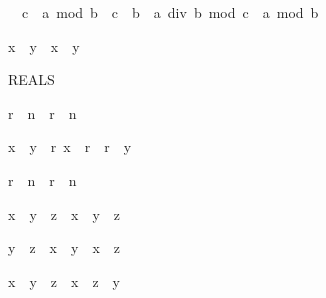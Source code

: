 \begin{isabellebody}
\begin{isamarkuptext}
\begin{isabelle}%
{\isacharhash}{}\ {\isacharless}\ c\ {\isasymLongrightarrow}\ a\ mod\ {\isacharparenleft}b\ {\isacharasterisk}\ c{\isacharparenright}\ {\isacharequal}\ b\ {\isacharasterisk}\ {\isacharparenleft}a\ div\ b\ mod\ c{\isacharparenright}\ {\isacharplus}\ a\ mod\ b%
\end{isabelle}

\begin{isabelle}%
{\isasymbar}x\ {\isacharasterisk}\ y{\isasymbar}\ {\isacharequal}\ {\isasymbar}x{\isasymbar}\ {\isacharasterisk}\ {\isasymbar}y{\isasymbar}%
\end{isabelle}
%
\end{isamarkuptext}%
%
\begin{isamarkuptext}%
REALS

\begin{isabelle}%
{\isasymbar}r{\isasymbar}\ {\isacharcircum}\ n\ {\isacharequal}\ {\isasymbar}r\ {\isacharcircum}\ n{\isasymbar}%
\end{isabelle}

\begin{isabelle}%
x\ {\isacharless}\ y\ {\isasymLongrightarrow}\ {\isasymexists}r{\isachardot}\ x\ {\isacharless}\ r\ {\isasymand}\ r\ {\isacharless}\ y%
\end{isabelle}

\begin{isabelle}%
{\isasymbar}r{\isasymbar}\ {\isacharcircum}\ n\ {\isacharequal}\ {\isasymbar}r\ {\isacharcircum}\ n{\isasymbar}%
\end{isabelle}

\begin{isabelle}%
x\ {\isacharasterisk}\ {\isacharparenleft}y\ {\isacharslash}\ z{\isacharparenright}\ {\isacharequal}\ x\ {\isacharasterisk}\ y\ {\isacharslash}\ z%
\end{isabelle}

\begin{isabelle}%
y\ {\isacharslash}\ z\ {\isacharasterisk}\ x\ {\isacharequal}\ y\ {\isacharasterisk}\ x\ {\isacharslash}\ z%
\end{isabelle}

\begin{isabelle}%
x\ {\isacharslash}\ {\isacharparenleft}y\ {\isacharslash}\ z{\isacharparenright}\ {\isacharequal}\ x\ {\isacharasterisk}\ z\ {\isacharslash}\ y%
\end{isabelle}


\end{isamarkuptext}
\end{isabellebody}
